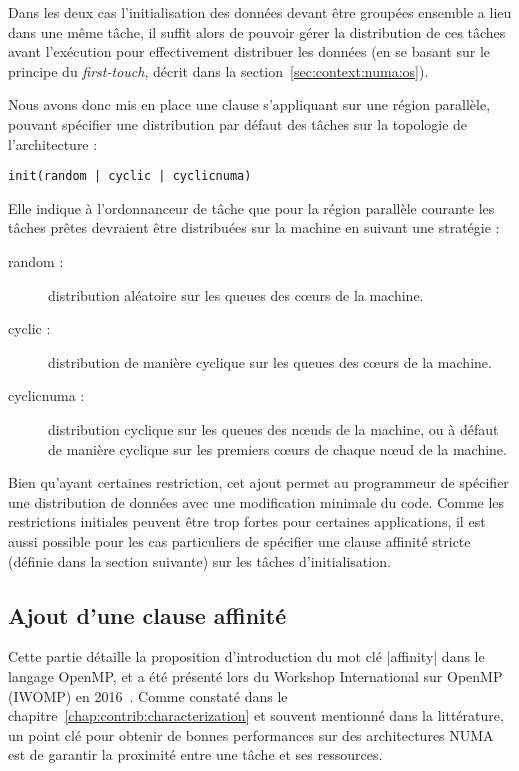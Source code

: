 Dans les deux cas l'initialisation des données devant être groupées ensemble a lieu dans une même tâche, il suffit alors de pouvoir gérer la distribution de ces tâches avant l'exécution pour effectivement distribuer les données (en se basant sur le principe du \emph{first-touch}, décrit dans la section~\ref{sec:context:numa:os}).

Nous avons donc mis en place une clause s'appliquant sur une région parallèle, pouvant spécifier une distribution par défaut des tâches sur la topologie de l'architecture :

\begin{lstlisting}
init(random | cyclic | cyclicnuma)
\end{lstlisting}

Elle indique à l'ordonnanceur de tâche que pour la région parallèle courante les tâches prêtes devraient être distribuées sur la machine en suivant une stratégie :

\begin{description}
  \item [random :]
    distribution aléatoire sur les queues des cœurs de la machine.
  \item [cyclic :]
    distribution de manière cyclique sur les queues des cœurs de la machine.
  \item [cyclicnuma :]
    distribution cyclique sur les queues des nœuds de la machine, ou à défaut de manière cyclique sur les premiers cœurs de chaque nœud de la machine.
\end{description}


Bien qu'ayant certaines restriction, cet ajout permet au programmeur de spécifier une distribution de données avec une modification minimale du code.
Comme les restrictions initiales peuvent être trop fortes pour certaines applications, il est aussi possible pour les cas particuliers de spécifier une clause affinité stricte (définie dans la section suivante) sur les tâches d'initialisation.

\subsection{Ajout d'une clause affinité}

Cette partie détaille la proposition d'introduction du mot clé |affinity| dans le langage OpenMP, et a été présenté lors du Workshop International sur OpenMP (IWOMP) en 2016~\cite{Virouleau2016b}.
Comme constaté dans le chapitre~\ref{chap:contrib:characterization} et souvent mentionné dans la littérature, un point clé pour obtenir de bonnes performances sur des architectures NUMA est de garantir la proximité entre une tâche et ses ressources.

